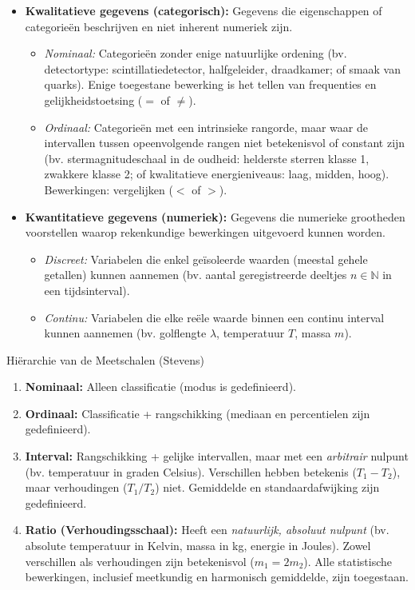 \documentclass[11pt,a4paper]{article}
\begin{document}
\begin{itemize}[leftmargin=1.5em]
    \item \textbf{Kwalitatieve gegevens (categorisch):} Gegevens die eigenschappen of categorieën beschrijven en niet inherent numeriek zijn.
    \begin{itemize}
        \item \emph{Nominaal:} Categorieën zonder enige natuurlijke ordening (bv. detectortype: scintillatiedetector, halfgeleider, draadkamer; of smaak van quarks). Enige toegestane bewerking is het tellen van frequenties en gelijkheidstoetsing ($=$ of $\neq$).
        \item \emph{Ordinaal:} Categorieën met een intrinsieke rangorde, maar waar de intervallen tussen opeenvolgende rangen niet betekenisvol of constant zijn (bv. stermagnitudeschaal in de oudheid: helderste sterren klasse 1, zwakkere klasse 2; of kwalitatieve energieniveaus: laag, midden, hoog). Bewerkingen: vergelijken ($<$ of $>$).
    \end{itemize}
    \item \textbf{Kwantitatieve gegevens (numeriek):} Gegevens die numerieke grootheden voorstellen waarop rekenkundige bewerkingen uitgevoerd kunnen worden.
    \begin{itemize}
        \item \emph{Discreet:} Variabelen die enkel geïsoleerde waarden (meestal gehele getallen) kunnen aannemen (bv. aantal geregistreerde deeltjes $n \in \mathbb{N}$ in een tijdsinterval).
        \item \emph{Continu:} Variabelen die elke reële waarde binnen een continu interval kunnen aannemen (bv. golflengte $\lambda$, temperatuur $T$, massa $m$).
    \end{itemize}
\end{itemize}

\begin{theobox}{Hiërarchie van de Meetschalen (Stevens)}
\begin{enumerate}[leftmargin=1.2em]
    \item \textbf{Nominaal:} Alleen classificatie (modus is gedefinieerd).
    \item \textbf{Ordinaal:} Classificatie + rangschikking (mediaan en percentielen zijn gedefinieerd).
    \item \textbf{Interval:} Rangschikking + gelijke intervallen, maar met een \emph{arbitrair} nulpunt (bv. temperatuur in graden Celsius). Verschillen hebben betekenis ($T_1 - T_2$), maar verhoudingen ($T_1 / T_2$) niet. Gemiddelde en standaardafwijking zijn gedefinieerd.
    \item \textbf{Ratio (Verhoudingsschaal):} Heeft een \emph{natuurlijk, absoluut nulpunt} (bv. absolute temperatuur in Kelvin, massa in kg, energie in Joules). Zowel verschillen als verhoudingen zijn betekenisvol ($m_1 = 2 m_2$). Alle statistische bewerkingen, inclusief meetkundig en harmonisch gemiddelde, zijn toegestaan.
\end{enumerate}
\end{theobox}
\end{document}
